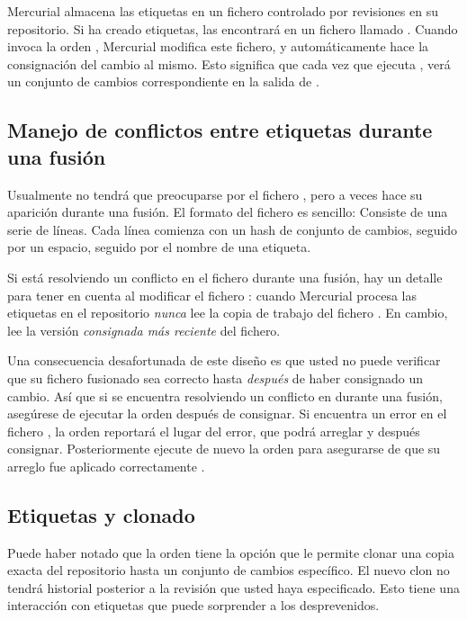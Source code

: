 Mercurial almacena las etiquetas en un fichero controlado por revisiones en
su repositorio. Si ha creado etiquetas, las encontrará en un fichero
llamado .  Cuando invoca la orden ,
Mercurial modifica este fichero, y automáticamente hace la consignación del
cambio al mismo.  Esto significa que cada vez que ejecuta ,
verá un conjunto de cambios correspondiente en la salida de .

\subsection{Manejo de conflictos entre etiquetas durante una fusión}

Usualmente no tendrá que preocuparse por el fichero ,
pero a veces hace su aparición durante una fusión. El formato del
fichero es sencillo: Consiste de una serie de líneas. Cada línea
comienza con un hash de conjunto de cambios, seguido por un espacio,
seguido por el nombre de una etiqueta.

Si está resolviendo un conflicto en el fichero 
durante una fusión, hay un detalle para tener en cuenta al modificar
el fichero :
cuando Mercurial procesa las etiquetas en el repositorio \emph{nunca}
lee la copia de trabajo del fichero .  En cambio,
lee la versión \emph{consignada más reciente} del fichero.

Una consecuencia desafortunada de este diseño es que usted no puede
verificar que su fichero  fusionado sea correcto hasta
\emph{después} de haber consignado un cambio. Así que si se
encuentra resolviendo un conflicto en  durante una
fusión, asegúrese de ejecutar la orden  después de
consignar. Si encuentra un error en el fichero , 
la orden reportará el lugar del error, que podrá arreglar y después
consignar. Posteriormente ejecute de nuevo la orden  para
asegurarse de que su arreglo fue aplicado correctamente .

\subsection{Etiquetas y clonado}

Puede haber notado que la orden  tiene la opción
 que le permite clonar una copia exacta del
repositorio hasta un conjunto de cambios específico. El nuevo clon no
tendrá historial posterior a la revisión que usted haya
especificado. Esto tiene una interacción con etiquetas que puede
sorprender a los desprevenidos.

